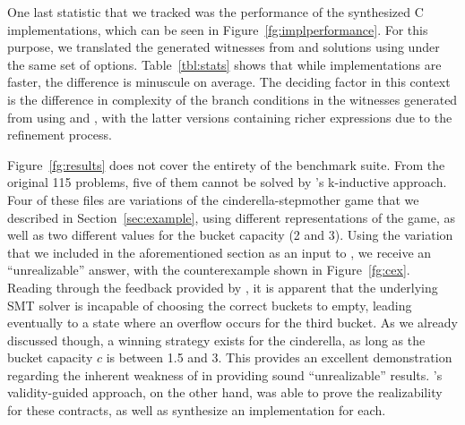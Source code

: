  One last statistic that we tracked was the performance of the synthesized C
 implementations, which can be seen in Figure~\ref{fg:implperformance}. For this purpose, we translated the
 generated witnesses from \jsyn and \jsynvg solutions using
 \smtlibtoc under the same set of options. Table~\ref{tbl:stats} shows that
 while \jsyn implementations are faster, the difference is minuscule on average. The deciding factor in this context is the
 difference in complexity of the branch conditions in the witnesses generated from 
 \aeval using \jsyn and \jsynvg, with the latter versions containing richer expressions due to the refinement process.

Figure~\ref{fg:results} does not cover the entirety of the
benchmark suite. From the original 115 problems, five of them cannot be
solved by \jsyn's k-inductive approach. Four of these files are variations of
the cinderella-stepmother game that we described in Section~\ref{sec:example}, using different representations of the game, as well as two different values
for the bucket capacity (2 and 3). Using the variation that we included in the
aforementioned section as an input to \jsyn, we receive an ``unrealizable'' answer, with the counterexample shown
in Figure~\ref{fg:cex}. Reading through the feedback provided by \jsyn, it is
apparent that the underlying SMT solver is incapable of choosing the correct
buckets to empty, leading eventually to a state where an overflow occurs for the
third bucket. As we already discussed though, a winning strategy exists for the
cinderella, as long as the bucket capacity $c$ is between 1.5 and 3. This
provides an excellent demonstration regarding the inherent weakness of \jsyn
in providing sound ``unrealizable'' results. \jsynvg's validity-guided approach,
on the other hand, was able to prove the realizability for these contracts, as
well as synthesize an implementation for each.

